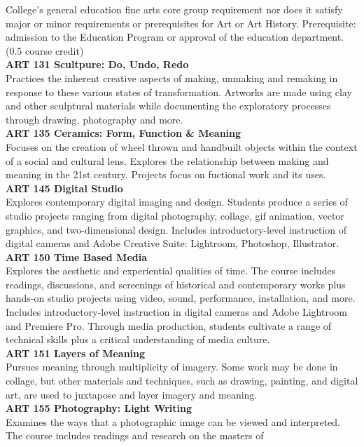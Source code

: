 \documentclass[
  letterpaper,
]{scrbook}
\begin{document}
College's general education fine arts core group requirement nor does it
satisfy major or minor requirements or prerequisites for Art or Art
History. Prerequisite: admission to the Education Program or approval of
the education department. (0.5 course credit)\\
\textbf{ART 131 Scultpure: Do, Undo, Redo}\\
Practices the inherent creative aspects of making, unmaking and remaking
in response to these various states of transformation. Artworks are made
using clay and other sculptural materials while documenting the
exploratory processes through drawing, photography and more.\\
\textbf{ART 135 Ceramics: Form, Function \& Meaning}\\
Focuses on the creation of wheel thrown and handbuilt objects within the
context of a social and cultural lens. Explores the relationship between
making and meaning in the 21st century. Projects focus on fuctional work
and its uses.\\
\textbf{ART 145 Digital Studio}\\
Explores contemporary digital imaging and design. Students produce a
series of studio projects ranging from digital photography, collage, gif
animation, vector graphics, and two-dimensional design. Includes
introductory-level instruction of digital cameras and Adobe Creative
Suite: Lightroom, Photoshop, Illustrator.\\
\textbf{ART 150 Time Based Media}\\
Explores the aesthetic and experiential qualities of time. The course
includes readings, discussions, and screenings of historical and
contemporary works plus hands-on studio projects using video, sound,
performance, installation, and more. Includes introductory-level
instruction in digital cameras and Adobe Lightroom and Premiere Pro.
Through media production, students cultivate a range of technical skills
plus a critical understanding of media culture.\\
\textbf{ART 151 Layers of Meaning}\\
Pursues meaning through multiplicity of imagery. Some work may be done
in collage, but other materials and techniques, such as drawing,
painting, and digital art, are used to juxtapose and layer imagery and
meaning.\\
\textbf{ART 155 Photography: Light Writing}\\
Examines the ways that a photographic image can be viewed and
interpreted. The course includes readings and research on the masters of
\end{document}
